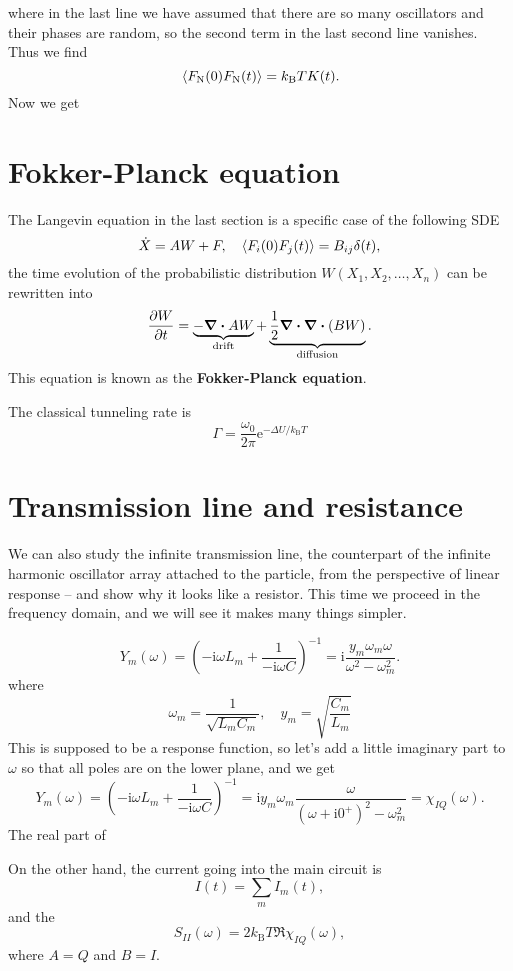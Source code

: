 \documentclass[hyperref, a4paper]{article}
\newcommand*{\ii}{\mathrm{i}}
\newcommand*{\ee}{\mathrm{e}}
\newcommand*{\concept}[1]{{\textbf{#1}}}
\newcommand*{\kB}{k_{\text{B}}}
\newcommand{\fn}{F_{\text{N}}}
\begin{document}
where in the last line we have assumed that 
there are so many oscillators and their phases are random,
so the second term in the last second line vanishes.
Thus we find 
\begin{equation}
    \expval*{\fn(0) \fn(t)} = \kB T K(t).
\end{equation}
Now we get 

\section{Fokker-Planck equation}

The Langevin equation in the last section is a specific case of the following SDE 
\begin{equation}
    \dot{X} = A W + F, \quad 
    \expval{F_i(0) F_j(t)} = B_{ij} \delta(t),
\end{equation}
the time evolution of the probabilistic distribution $W(X_1, X_2, \ldots, X_n)$ 
can be rewritten into  
\begin{equation}
    \pdv{W}{t} = \underbrace{
        - \div{A W}
    }_{\text{drift}} + 
    \underbrace{
        \frac{1}{2} \div \div (B W)
    }_{\text{diffusion}} . 
\end{equation}
This equation is known as the \concept{Fokker-Planck equation}.

The classical tunneling rate is 
\begin{equation}
    \Gamma = \frac{\omega_0}{2\pi} \ee^{- \Delta U / \kB T}
\end{equation}

\section{Transmission line and resistance}

We can also study the infinite transmission line,
the counterpart of the infinite harmonic oscillator array 
attached to the particle,
from the perspective of linear response -- 
and show why it looks like a resistor.
This time we proceed in the frequency domain,
and we will see it makes many things simpler. 

\begin{equation}
    Y_m(\omega) = \left(
        - \ii \omega L_m + \frac{1}{- \ii \omega C}
    \right)^{-1} 
    = \ii \frac{y_m \omega_m \omega}{
        \omega^2 - \omega_m^2
    }. 
\end{equation}
where 
\begin{equation}
    \omega_m = \frac{1}{\sqrt{L_m C_m}}, \quad 
    y_m = \sqrt{\frac{C_m}{L_m}}
\end{equation}
This is supposed to be a response function,
so let's add a little imaginary part to $\omega$ 
so that all poles are on the lower plane,
and we get 
\begin{equation}
    Y_m(\omega) = \left(
        - \ii \omega L_m + \frac{1}{- \ii \omega C}
    \right)^{-1} 
    = \ii y_m \omega_m \frac{ \omega}{
        (\omega + \ii 0^+)^2 - \omega_m^2
    } = \chi_{I Q}(\omega). 
\end{equation}
The real part of 

On the other hand, the current going into the main circuit is 
\begin{equation}
    I(t) = \sum_m I_m(t),
\end{equation}
and the 
\begin{equation}
    S_{II}(\omega) = 2 \kB T \Re \chi_{I Q} (\omega),
\end{equation}
where $A = Q$ and $B = I$.

\printbibliography
\end{document}
